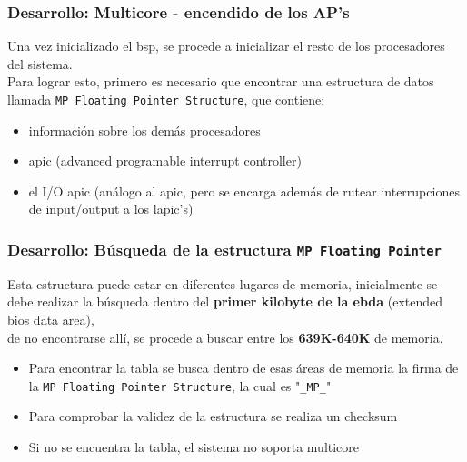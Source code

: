 \documentclass{beamer}
\begin{document}
\begin{frame}
\frametitle{Desarrollo: Multicore - encendido de los AP's}
Una vez inicializado el bsp, se procede a inicializar el resto de los procesadores del sistema.\\
\vspace{20pt}
Para lograr esto, primero es necesario que encontrar una estructura de datos llamada \texttt{MP Floating Pointer Structure}, que contiene:

\begin{itemize} \scriptsize
 \item información sobre los demás procesadores
 \item apic (advanced programable interrupt controller)
 \item el I/O apic (análogo al apic, pero se encarga además de rutear interrupciones de input/output a los lapic's)
\end{itemize}
\end{frame}

\begin{frame}
  \frametitle{Desarrollo: \small Búsqueda de la estructura \texttt{MP Floating Pointer}}
  Esta estructura puede estar en diferentes lugares de memoria, inicialmente se debe realizar la búsqueda dentro del \textbf{primer kilobyte de la ebda} (extended bios data area), \\
  de no encontrarse allí, se procede a buscar entre los \textbf{639K-640K} de memoria.\\
  \vspace{10pt}
  \begin{itemize}
   \item Para encontrar la tabla se busca dentro de esas áreas de memoria la firma de la \texttt{MP Floating Pointer Structure}, la cual es "\texttt{\_MP\_}"
  \item Para comprobar la validez de la estructura se realiza un checksum
  \item Si no se encuentra la tabla, el sistema no soporta multicore
  \end{itemize}
\end{frame}

\end{document}
